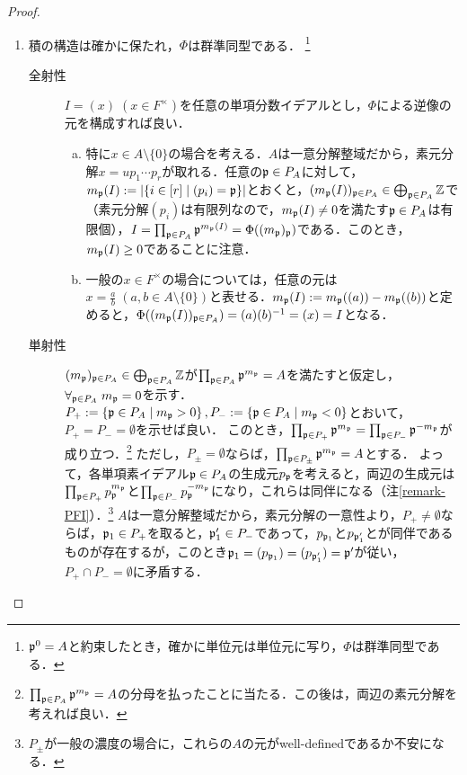 \documentclass[uplatex,dvipdfmx]{jsreport}
\begin{document}
\begin{proof}\mbox{}
    \begin{enumerate}
        \item 積の構造は確かに保たれ，$\Phi$は群準同型である．
        \footnote{$\mathfrak{p}^0=A$と約束したとき，確かに単位元は単位元に写り，$\Phi$は群準同型である．}
        \begin{description}
            \item[全射性] $I=(x)\;(x\in F^\times)$を任意の単項分数イデアルとし，$\Phi$による逆像の元を構成すれば良い．
            \begin{enumerate}[(a)]
                \item 特に$x\in A\setminus\{0\}$の場合を考える．$A$は一意分解整域だから，素元分解$x=up_1\cdots p_r$が取れる．任意の$\mathfrak{p}\in P_A$に対して，$m_{\mathfrak{p}}(I):=\left|\left\{i\in[r]\mid(p_i)=\mathfrak{p}\right\}\right|$とおくと，$(m_{\mathfrak{p}}(I))_{\mathfrak{p}\in P_A}\in\bigoplus_{\mathfrak{p}\in P_A}\mathbb{Z}$で（素元分解$(p_i)$は有限列なので，$m_{\mathfrak{p}}(I)\ne 0$を満たす$\mathfrak{p}\in P_A$は有限個），$I=\prod_{\mathfrak{p}\in P_A}\mathfrak{p}^{m_{\mathfrak{p}}(I)}=\Phi((m_{\mathfrak{p}})_{\mathfrak{p}})$である．このとき，$m_{\mathfrak{p}}(I)\ge 0$であることに注意．
                \item 一般の$x\in F^\times$の場合については，任意の元は$x=\frac{a}{b}\;(a,b\in A\setminus\{0\})$と表せる．$m_{\mathfrak{p}}(I):=m_{\mathfrak{p}}((a))-m_{\mathfrak{p}}((b))$と定めると，$\Phi((m_{\mathfrak{p}}(I))_{\mathfrak{p}\in P_A})=(a)(b)^{-1}=(x)=I$となる．
            \end{enumerate}
            \item[単射性] 
            $(m_{\mathfrak{p}})_{\mathfrak{p}\in P_A}\in\bigoplus_{\mathfrak{p}\in P_A}\mathbb{Z}$が$\prod_{\mathfrak{p}\in P_A}\mathfrak{p}^{m_{\mathfrak{p}}}=A$を満たすと仮定し，$\forall_{\mathfrak{p}\in P_A}\;m_{\mathfrak{p}}=0$を示す．
            $P_+:=\left\{\mathfrak{p}\in P_A\mid m_{\mathfrak{p}}>0\right\},P_-:=\left\{\mathfrak{p}\in P_A\mid m_{\mathfrak{p}}<0\right\}$とおいて，$P_+=P_-=\emptyset$を示せば良い．
            このとき，$\prod_{\mathfrak{p}\in P_+}\mathfrak{p}^{m_{\mathfrak{p}}}=\prod_{\mathfrak{p}\in P_-}\mathfrak{p}^{-m_{\mathfrak{p}}}$が成り立つ．\footnote{$\prod_{\mathfrak{p}\in P_A}\mathfrak{p}^{m_{\mathfrak{p}}}=A$の分母を払ったことに当たる．この後は，両辺の素元分解を考えれば良い．}
            ただし，$P_\pm=\emptyset$ならば，$\prod_{\mathfrak{p}\in P_\pm}\mathfrak{p}^{m_{\mathfrak{p}}}=A$とする．
            よって，各単項素イデアル$\mathfrak{p}\in P_A$の生成元$p_{\mathfrak{p}}$を考えると，両辺の生成元は$\prod_{\mathfrak{p}\in P_+}p_{\mathfrak{p}}^{m_{\mathfrak{p}}}$と$\prod_{\mathfrak{p}\in P_-}p_{\mathfrak{p}}^{-m_{\mathfrak{p}}}$になり，これらは同伴になる（注\ref{remark-PFI}）．\footnote{$P_\pm$が一般の濃度の場合に，これらの$A$の元がwell-definedであるか不安になる．}
            $A$は一意分解整域だから，素元分解の一意性より，$P_+\ne\emptyset$ならば，$\mathfrak{p}_1\in P_+$を取ると，$\mathfrak{p}'_1\in P_-$であって，$p_{\mathfrak{p}_1}$と$p_{\mathfrak{p}'_1}$とが同伴であるものが存在するが，このとき$\mathfrak{p}_1=(p_{\mathfrak{p}_1})=(p_{\mathfrak{p}'_1})=\mathfrak{p}'$が従い，$P_+\cap P_-=\emptyset$に矛盾する．

\end{description}
\end{enumerate}
\end{proof}
\end{document}
